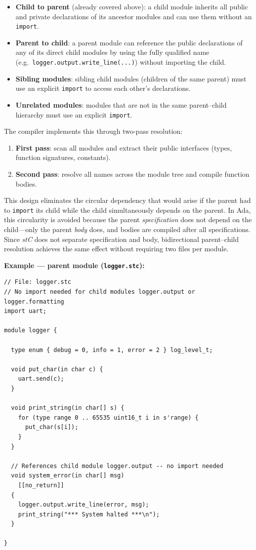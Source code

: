 \documentclass[11pt,letterpaper,twoside,openany]{book}
\begin{document}
\begin{itemize}
\item \textbf{Child to parent} (already covered above): a child module inherits all
      public and private declarations of its ancestor modules and can use them
      without an \verb'import'.
\item \textbf{Parent to child}: a parent module can reference the public declarations
      of any of its direct child modules by using the fully qualified name
      (e.g.\ \verb'logger.output.write_line(...)') without importing the child.
\item \textbf{Sibling modules}: sibling child modules (children of the same parent)
      must use an explicit \verb'import' to access each other's declarations.
\item \textbf{Unrelated modules}: modules that are not in the same parent--child
      hierarchy must use an explicit \verb'import'.
\end{itemize}

The compiler implements this through two-pass resolution:
\begin{enumerate}
\item \textbf{First pass}: scan all modules and extract their public interfaces
      (types, function signatures, constants).
\item \textbf{Second pass}: resolve all names across the module tree and compile
      function bodies.
\end{enumerate}

This design eliminates the circular dependency that would arise if the parent had to
\verb'import' its child while the child simultaneously depends on the parent.
In Ada, this circularity is avoided because the parent \emph{specification} does not
depend on the child---only the parent \emph{body} does, and bodies are compiled after
all specifications.  Since \emph{stC} does not separate specification and body,
bidirectional parent--child resolution achieves the same effect without requiring
two files per module.

\textbf{Example --- parent module (\texttt{logger.stc}):}

\begin{lstlisting}
// File: logger.stc
// No import needed for child modules logger.output or logger.formatting
import uart;

module logger {

  type enum { debug = 0, info = 1, error = 2 } log_level_t;

  void put_char(in char c) {
    uart.send(c);
  }

  void print_string(in char[] s) {
    for (type range 0 .. 65535 uint16_t i in s'range) {
      put_char(s[i]);
    }
  }

  // References child module logger.output -- no import needed
  void system_error(in char[] msg)
    [[no_return]]
  {
    logger.output.write_line(error, msg);
    print_string("*** System halted ***\n");
  }

}
\end{lstlisting}
\end{document}
